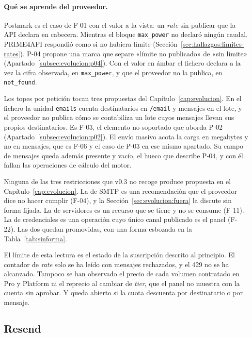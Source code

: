 \paragraph{Qué se aprende del proveedor.} Postmark es el caso de F-01 con
el valor a la vista: un \textit{rate} sin publicar que la API declara en
cabecera. Mientras el bloque \texttt{max\_power} no declaró ningún caudal, PRIME4API
respondió como si no hubiera límite
(Sección~\ref{sec:hallazgos:limites-rates}). P-04 propone una marca que
separe «límite no publicado» de «sin límite»
(Apartado~\ref{subsec:evolucion:p04}). Con el valor en ámbar el fichero
declara a la vez la cifra observada, en \texttt{max\_power}, y que el
proveedor no la publica, en \texttt{not\_found}.

Los topes por petición tocan tres propuestas del
Capítulo~\ref{cap:evolucion}. En el fichero la unidad \texttt{emails}
cuenta destinatarios en \texttt{/email} y mensajes en el lote, y el
proveedor no publica cómo se contabiliza un lote cuyos mensajes llevan sus
propios destinatarios. Es F-03, el elemento no soportado que aborda P-02
(Apartado~\ref{subsec:evolucion:p02}). El envío masivo acota la carga en
megabytes y no en mensajes, que es F-06 y el caso de P-03 en ese mismo
apartado. Su campo de mensajes queda además presente y vacío, el hueco que
describe P-04, y con él fallan las operaciones de cálculo del motor.

Ninguna de las tres restricciones que v0.3 no recoge produce propuesta en
el Capítulo~\ref{cap:evolucion}.
La de SMTP es una recomendación que el proveedor dice no
hacer cumplir (F-04), y la Sección~\ref{sec:evolucion:fuera} la discute sin
forma fijada. La de servidores es un recurso
que se tiene y no se consume (F-11). La de credenciales es una operación
cuyo único canal publicado es el panel (F-22). Las dos quedan promovidas,
con una forma esbozada en la Tabla~\ref{tab:sinforma}.

El límite de esta lectura es el estado de la suscripción descrito al principio.
El contador de \textit{rate} solo se ha leído con mensajes rechazados, y
el 429 no se ha alcanzado. Tampoco se han
observado el precio de cada volumen contratado en Pro y Platform ni el
reprecio al cambiar de \textit{tier}, que el panel no muestra con la
cuenta sin aprobar. Y
queda abierto si la cuota descuenta por destinatario o por mensaje.

\subsection{Resend}
\label{subsec:hallazgos:resend}

